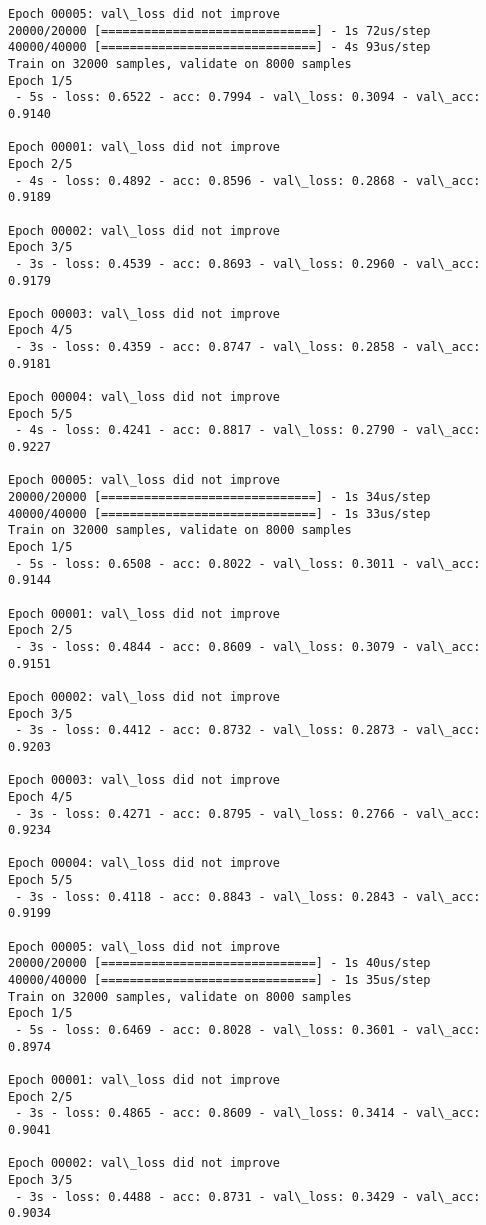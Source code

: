 \documentclass[11pt]{article}
\begin{document}
\begin{Verbatim}[commandchars=\\\{\}]
Epoch 00005: val\_loss did not improve
20000/20000 [==============================] - 1s 72us/step
40000/40000 [==============================] - 4s 93us/step
Train on 32000 samples, validate on 8000 samples
Epoch 1/5
 - 5s - loss: 0.6522 - acc: 0.7994 - val\_loss: 0.3094 - val\_acc: 0.9140

Epoch 00001: val\_loss did not improve
Epoch 2/5
 - 4s - loss: 0.4892 - acc: 0.8596 - val\_loss: 0.2868 - val\_acc: 0.9189

Epoch 00002: val\_loss did not improve
Epoch 3/5
 - 3s - loss: 0.4539 - acc: 0.8693 - val\_loss: 0.2960 - val\_acc: 0.9179

Epoch 00003: val\_loss did not improve
Epoch 4/5
 - 3s - loss: 0.4359 - acc: 0.8747 - val\_loss: 0.2858 - val\_acc: 0.9181

Epoch 00004: val\_loss did not improve
Epoch 5/5
 - 4s - loss: 0.4241 - acc: 0.8817 - val\_loss: 0.2790 - val\_acc: 0.9227

Epoch 00005: val\_loss did not improve
20000/20000 [==============================] - 1s 34us/step
40000/40000 [==============================] - 1s 33us/step
Train on 32000 samples, validate on 8000 samples
Epoch 1/5
 - 5s - loss: 0.6508 - acc: 0.8022 - val\_loss: 0.3011 - val\_acc: 0.9144

Epoch 00001: val\_loss did not improve
Epoch 2/5
 - 3s - loss: 0.4844 - acc: 0.8609 - val\_loss: 0.3079 - val\_acc: 0.9151

Epoch 00002: val\_loss did not improve
Epoch 3/5
 - 3s - loss: 0.4412 - acc: 0.8732 - val\_loss: 0.2873 - val\_acc: 0.9203

Epoch 00003: val\_loss did not improve
Epoch 4/5
 - 3s - loss: 0.4271 - acc: 0.8795 - val\_loss: 0.2766 - val\_acc: 0.9234

Epoch 00004: val\_loss did not improve
Epoch 5/5
 - 3s - loss: 0.4118 - acc: 0.8843 - val\_loss: 0.2843 - val\_acc: 0.9199

Epoch 00005: val\_loss did not improve
20000/20000 [==============================] - 1s 40us/step
40000/40000 [==============================] - 1s 35us/step
Train on 32000 samples, validate on 8000 samples
Epoch 1/5
 - 5s - loss: 0.6469 - acc: 0.8028 - val\_loss: 0.3601 - val\_acc: 0.8974

Epoch 00001: val\_loss did not improve
Epoch 2/5
 - 3s - loss: 0.4865 - acc: 0.8609 - val\_loss: 0.3414 - val\_acc: 0.9041

Epoch 00002: val\_loss did not improve
Epoch 3/5
 - 3s - loss: 0.4488 - acc: 0.8731 - val\_loss: 0.3429 - val\_acc: 0.9034


\end{Verbatim}
\end{document}
